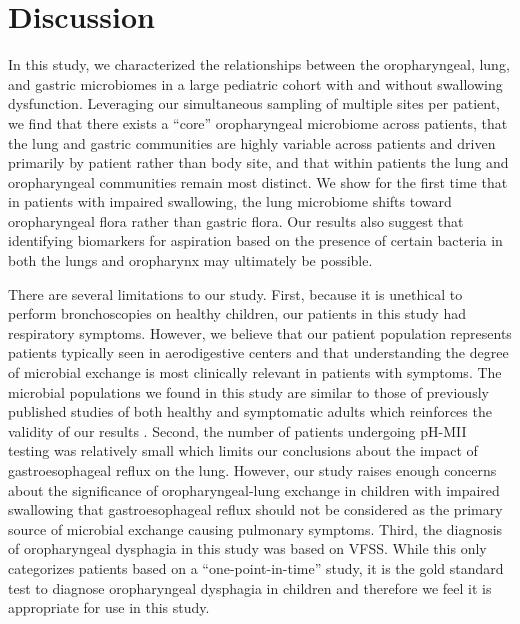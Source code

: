 \documentclass{article}
\begin{document}
\FloatBarrier

\section{Discussion}

In this study, we characterized the relationships between the oropharyngeal, lung, and gastric microbiomes in a large pediatric cohort with and without swallowing dysfunction.
Leveraging our simultaneous sampling of multiple sites per patient, we find that there exists a ``core'' oropharyngeal microbiome across patients, that the lung and gastric communities are highly variable across patients and driven primarily by patient rather than body site, and that within patients the lung and oropharyngeal communities remain most distinct.
We show for the first time that in patients with impaired swallowing, the lung microbiome shifts toward oropharyngeal flora rather than gastric flora.
Our results also suggest that identifying biomarkers for aspiration based on the presence of certain bacteria in both the lungs and oropharynx may ultimately be possible.

There are several limitations to our study. 
First, because it is unethical to perform bronchoscopies on healthy children, our patients in this study had respiratory symptoms. 
However, we believe that our patient population represents patients typically seen in aerodigestive centers and that understanding the degree of microbial exchange is most clinically relevant in patients with symptoms.
The microbial populations we found in this study are similar to those of previously published studies of both healthy and symptomatic adults which reinforces the validity of our results \cite{Bassis2015source,Charlson2011topographical,erbDownward-2011-COPD,morris-2013-healthsmokers}.
Second, the number of patients undergoing pH-MII testing was relatively small which limits our conclusions about the impact of gastroesophageal reflux on the lung. 
However, our study raises enough concerns about the significance of oropharyngeal-lung exchange in children with impaired swallowing that gastroesophageal reflux should not be considered as the primary source of microbial exchange causing pulmonary symptoms.
Third, the diagnosis of oropharyngeal dysphagia in this study was based on VFSS. 
While this only categorizes patients based on a “one-point-in-time” study, it is the gold standard test to diagnose oropharyngeal dysphagia in children and therefore we feel it is appropriate for use in this study. 
\end{document}
